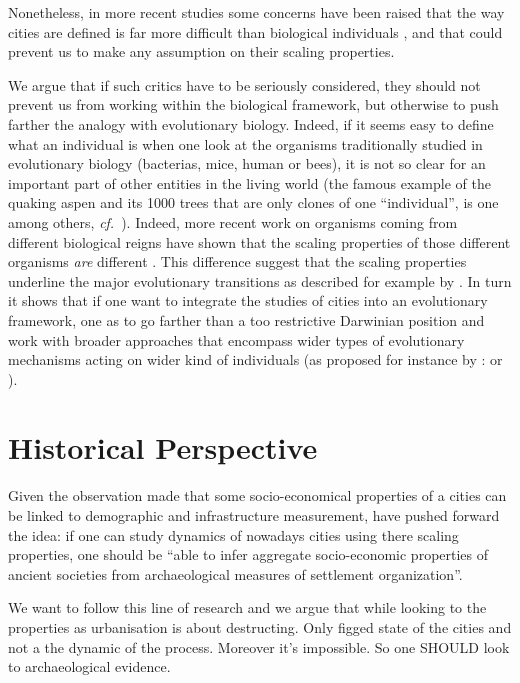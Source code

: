 \documentclass[a4paper,11pt]{article}
\begin{document}
Nonetheless, in more recent studies \citep{arcaute2015constructingcitiesdeconstructingscalinglaws} some concerns have been raised that the way cities are defined is far more difficult than biological individuals , and that could prevent us to make any assumption on their scaling properties. 

We argue that if such critics have to be seriously considered, they should not prevent us from working within the biological framework, but otherwise to push farther the analogy with evolutionary biology. Indeed, if it seems easy to define what an individual is when one look at the organisms traditionally studied in evolutionary biology (bacterias, mice, human or bees), it is not so clear for an important part of other entities in the living world (the famous example of the quaking aspen and its 1000 trees that are only clones of one ``individual'', is one among others, \emph{cf.}~\cite{bouchard2011darwinismwithoutpopulationsamoreinclusiveunderstandingofsotf}).
Indeed, more recent work on organisms coming from different biological reigns have shown that the scaling properties of those different organisms \emph{are} different \citep{delong2010shiftsinmetabolicscalingproductionandefficiencyacrossmajorevolutionarytransitionsoflife}. This difference suggest that the scaling properties underline the major evolutionary transitions as described for example by \cite{maynardsmith1997major}. In turn it shows that if one want to integrate the studies of cities into an evolutionary framework, one as to go farther than a too restrictive Darwinian position and work with broader approaches that encompass wider types of evolutionary mechanisms acting on wider kind of individuals (as proposed for instance by : \cite{godfrey2009darwinian} or \cite{jablonka2014evolution}). 


\section{Historical Perspective}

Given the observation made that some socio-economical properties of a cities can be linked to demographic and infrastructure measurement, \cite{ortman2014theprehistoryofurbanscaling} have pushed forward the idea: if one can study dynamics of nowadays cities using there scaling properties, one should be ``able to infer aggregate socio-economic properties of ancient societies from archaeological measures of settlement organization''. 

We  want to follow this line of research and we argue that while looking to the properties as urbanisation is about destructing. Only figged state of the cities and not a the dynamic of the process. Moreover it's impossible. So one SHOULD look to archaeological evidence. 
\end{document}
